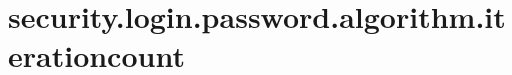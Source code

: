\section{security.login.password.algorithm.iterationcount}
\label{configuration:SecurityLoginPasswordAlgorithmIterationcount}
\AvailableInJavaOnly{\TODO}